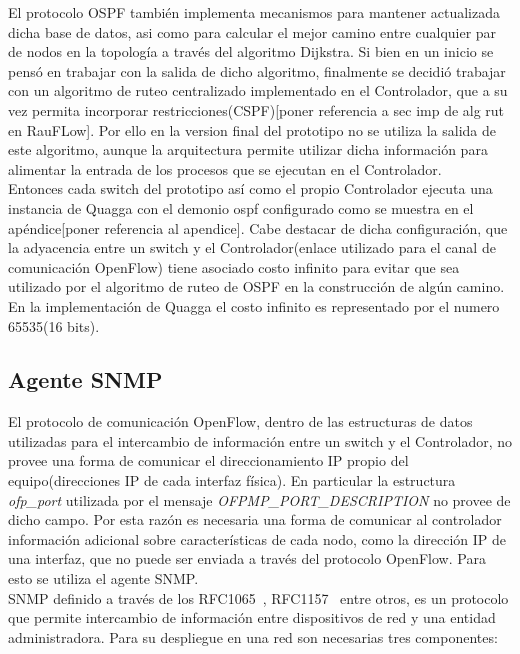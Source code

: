El protocolo OSPF también implementa mecanismos para mantener actualizada dicha base de datos, asi como para calcular el mejor camino entre cualquier par de nodos en la topolog\'ia a través del algoritmo Dijkstra. Si bien en un inicio se pensó en trabajar con la salida de dicho algoritmo, finalmente se decidió trabajar con un algoritmo de ruteo centralizado implementado en el Controlador, que a su vez permita incorporar restricciones(CSPF)[poner referencia a sec imp de alg rut en RauFLow]. Por ello en la version final del prototipo no se utiliza la salida de este algoritmo, aunque la arquitectura permite utilizar dicha información para alimentar la entrada de los procesos que se ejecutan en el Controlador.\\

Entonces cada switch del prototipo así como el propio Controlador ejecuta una instancia de Quagga con el demonio ospf configurado como se muestra en el apéndice[poner referencia al apendice]. Cabe destacar de dicha configuración, que la adyacencia entre un switch y el Controlador(enlace utilizado para el canal de comunicación OpenFlow) tiene asociado costo infinito para evitar que sea utilizado por el algoritmo de ruteo de OSPF en la construcción de algún camino. En la implementaci\'on de Quagga el costo infinito es representado por el numero 65535(16 bits).

\subsection{Agente SNMP}
El protocolo de comunicación OpenFlow, dentro de las estructuras de datos utilizadas para el intercambio de información entre un switch y el Controlador, no provee una forma de comunicar el direccionamiento IP propio del equipo(direcciones IP de cada interfaz física). En particular la estructura \textit{ofp\_port} utilizada por el mensaje \textit{OFPMP\_PORT\_DESCRIPTION} no provee de dicho campo\citep{ofv133spec}. Por esta razón es necesaria una forma de comunicar al controlador información adicional sobre características de cada nodo, como la dirección IP de una interfaz, que no puede ser enviada a través del protocolo OpenFlow. Para esto se utiliza el agente SNMP.\\

SNMP definido a través de los RFC1065~\citep{rose1990structure}, RFC1157~\citep{case1989simple} entre otros, es un protocolo que permite intercambio de información entre dispositivos de red y una entidad administradora. Para su despliegue en una red son necesarias tres componentes: 

